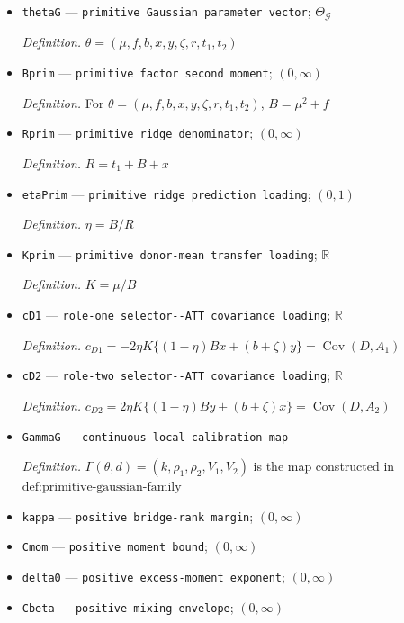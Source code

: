 \documentclass{article}
\begin{document}
\begin{itemize}
  \item \texttt{thetaG} --- \texttt{primitive Gaussian parameter vector}; \(\Theta_{\mathcal G}\)
  \par\smallskip\noindent\emph{Definition.} \(\theta=(\mu,f,b,x,y,\zeta,r,t_1,t_2)\)
  \item \texttt{Bprim} --- \texttt{primitive factor second moment}; \((0,\infty)\)
  \par\smallskip\noindent\emph{Definition.} For \(\theta=(\mu,f,b,x,y,\zeta,r,t_1,t_2)\), \(B=\mu^2+f\)
  \item \texttt{Rprim} --- \texttt{primitive ridge denominator}; \((0,\infty)\)
  \par\smallskip\noindent\emph{Definition.} \(R=t_1+B+x\)
  \item \texttt{etaPrim} --- \texttt{primitive ridge prediction loading}; \((0,1)\)
  \par\smallskip\noindent\emph{Definition.} \(\eta=B/R\)
  \item \texttt{Kprim} --- \texttt{primitive donor-\allowbreak{}mean transfer loading}; \(\mathbb R\)
  \par\smallskip\noindent\emph{Definition.} \(K=\mu/B\)
  \item \texttt{cD1} --- \texttt{role-\allowbreak{}one selector-\allowbreak{}-\allowbreak{}ATT covariance loading}; \(\mathbb R\)
  \par\smallskip\noindent\emph{Definition.} \(c_{D1}=-2\eta K\{(1-\eta)Bx+(b+\zeta)y\}=\operatorname{Cov}(D,A_1)\)
  \item \texttt{cD2} --- \texttt{role-\allowbreak{}two selector-\allowbreak{}-\allowbreak{}ATT covariance loading}; \(\mathbb R\)
  \par\smallskip\noindent\emph{Definition.} \(c_{D2}=2\eta K\{(1-\eta)By+(b+\zeta)x\}=\operatorname{Cov}(D,A_2)\)
  \item \texttt{GammaG} --- \texttt{continuous local calibration map}
  \par\smallskip\noindent\emph{Definition.} \(\Gamma(\theta,d)=(k,\rho_1,\rho_2,V_1,V_2)\) is the map constructed in \(\text{def:primitive-gaussian-family}\)
  \item \texttt{kappa} --- \texttt{positive bridge-\allowbreak{}rank margin}; \((0,\infty)\)
  \item \texttt{Cmom} --- \texttt{positive moment bound}; \((0,\infty)\)
  \item \texttt{delta0} --- \texttt{positive excess-\allowbreak{}moment exponent}; \((0,\infty)\)
  \item \texttt{Cbeta} --- \texttt{positive mixing envelope}; \((0,\infty)\)

\end{itemize}
\end{document}
